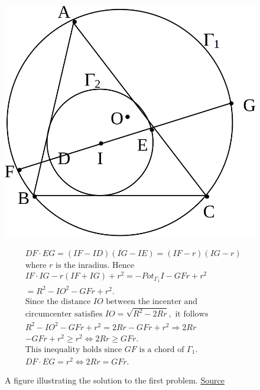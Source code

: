 \documentclass[12pt]{article}
\begin{document}
      \begin{figure}[h]
        \centering
        \begin{minipage}{0.3\textwidth}
          \includegraphics[width=\linewidth]{first.png}
          \caption{A figure illustrating the solution to the first problem. \href{https://www.obm.org.br/content/uploads/2017/01/eixos-2.pdf}{Source}}
        \end{minipage}
        \hfill
        \begin{minipage}{0.5\textwidth}
          \begin{align*}
            &DF \cdot EG = (IF - ID)(IG - IE) = (IF - r)(IG - r) \\
            &\text{where } r \text{ is the inradius. Hence} \\
            &IF \cdot IG - r(IF + IG) + r^2 = - Pot_{\Gamma_{1}} I - GFr + r^2 \\
            &= R^2 - IO^2 - GFr + r^2. \\
            &\text{Since the distance } IO \text{ between the incenter and} \\
            &\text{circumcenter satisfies } IO = \sqrt{R^2 - 2Rr}, \text{ it follows} \\
            &R^2 - IO^2 - GFr + r^2 = 2Rr - GFr + r^2 \Rightarrow 2Rr \\
            &- GFr + r^2 \geq r^2 \iff 2R r \geq GFr. \\
            &\text{This inequality holds since } GF \text{ is a chord of } \Gamma_1. \\
            &DF \cdot EG = r^2 \iff 2Rr = GFr.
          \end{align*}
        \end{minipage}
      \end{figure}
\end{document}
